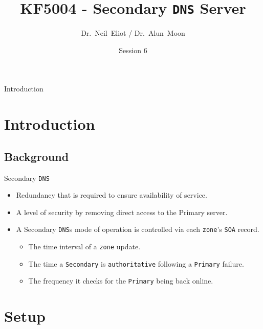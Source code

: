 \documentclass[xcolor=table]{beamer}
\title{KF5004 - Secondary \texttt{DNS} Server}
\author{Dr.~Neil~Eliot\inst{1} / Dr.~Alun~Moon\inst{1}}
\institute[Northumbria University] %
{
  \inst{1}
  Department of Computer and Information Sciences\\
  University of Northumbria
}
\date{Session 6}
\begin{document}
\begin{frame}
  \titlepage
\end{frame}

\begin{frame}{Introduction}
  \tableofcontents
\end{frame}


\section{Introduction}
\subsection{Background}
\begin{frame}{Secondary \texttt{DNS}}
  \begin{itemize}
    \item Redundancy that is required to ensure availability of service.
    \item A level of security by removing direct access to the Primary server.
    \item A Secondary \texttt{DNS}s mode of operation is controlled via each \texttt{zone}’s \texttt{SOA} record.
      \begin{itemize}
        \item The time interval of a \texttt{zone} update.
        \item The time a \texttt{Secondary} is \texttt{authoritative} following a \texttt{Primary} failure.
        \item The frequency it checks for the \texttt{Primary} being back online.
      \end{itemize}
  \end{itemize}
\end{frame}

\section{Setup}
\end{document}
